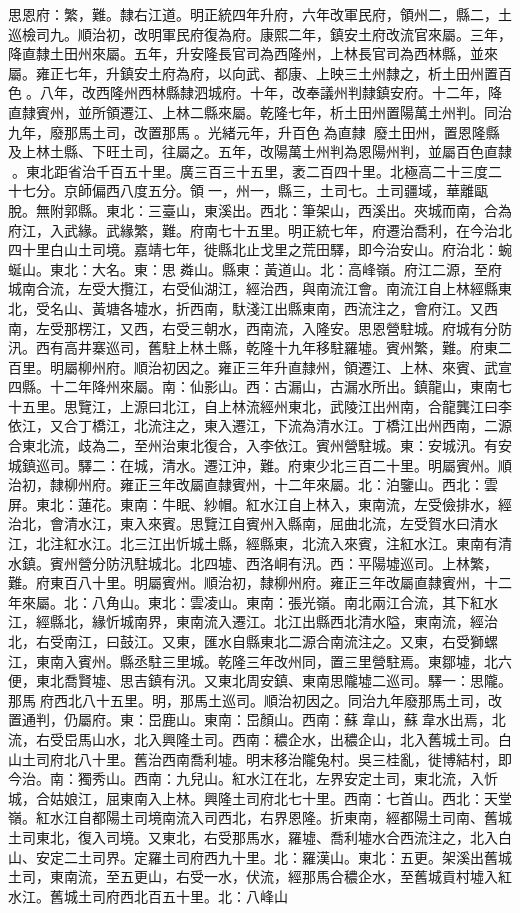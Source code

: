 \begin{pinyinscope}
思恩府：繁，難。隸右江道。明正統四年升府，六年改軍民府，領州二，縣二，土巡檢司九。順治初，改明軍民府復為府。康熙二年，鎮安土府改流官來屬。三年，降直隸土田州來屬。五年，升安隆長官司為西隆州，上林長官司為西林縣，並來屬。雍正七年，升鎮安土府為府，以向武、都康、上映三土州隸之，析土田州置百色。八年，改西隆州西林縣隸泗城府。十年，改奉議州判隸鎮安府。十二年，降直隸賓州，並所領遷江、上林二縣來屬。乾隆七年，析土田州置陽萬土州判。同治九年，廢那馬土司，改置那馬。光緒元年，升百色為直隸，廢土田州，置恩隆縣及上林土縣、下旺土司，往屬之。五年，改陽萬土州判為恩陽州判，並屬百色直隸。東北距省治千百五十里。廣三百三十五里，袤二百四十里。北極高二十三度二十七分。京師偏西八度五分。領一，州一，縣三，土司七。土司疆域，華離甌脫。無附郭縣。東北：三臺山，東溪出。西北：筆架山，西溪出。夾城而南，合為府江，入武緣。武緣繁，難。府南七十五里。明正統七年，府遷治喬利，在今治北四十里白山土司境。嘉靖七年，徙縣北止戈里之荒田驛，即今治安山。府治北：蜿蜒山。東北：大名。東：思粦山。縣東：黃道山。北：高峰嶺。府江二源，至府城南合流，左受大攬江，右受仙湖江，經治西，與南流江會。南流江自上林經縣東北，受名山、黃塘各墟水，折西南，馱淺江出縣東南，西流注之，會府江。又西南，左受那楞江，又西，右受三朝水，西南流，入隆安。思恩營駐城。府城有分防汛。西有高井寨巡司，舊駐上林土縣，乾隆十九年移駐羅墟。賓州繁，難。府東二百里。明屬柳州府。順治初因之。雍正三年升直隸州，領遷江、上林、來賓、武宣四縣。十二年降州來屬。南：仙影山。西：古漏山，古漏水所出。鎮龍山，東南七十五里。思覽江，上源曰北江，自上林流經州東北，武陵江出州南，合龍龔江曰李依江，又合丁橋江，北流注之，東入遷江，下流為清水江。丁橋江出州西南，二源合東北流，歧為二，至州治東北復合，入李依江。賓州營駐城。東：安城汛。有安城鎮巡司。驛二：在城，清水。遷江沖，難。府東少北三百二十里。明屬賓州。順治初，隸柳州府。雍正三年改屬直隸賓州，十二年來屬。北：泊鑒山。西北：雲屏。東北：蓮花。東南：牛眠、紗帽。紅水江自上林入，東南流，左受儉排水，經治北，會清水江，東入來賓。思覽江自賓州入縣南，屈曲北流，左受賀水曰清水江，北注紅水江。北三江出忻城土縣，經縣東，北流入來賓，注紅水江。東南有清水鎮。賓州營分防汛駐城北。北四墟、西洛峒有汛。西：平陽墟巡司。上林繁，難。府東百八十里。明屬賓州。順治初，隸柳州府。雍正三年改屬直隸賓州，十二年來屬。北：八角山。東北：雲凌山。東南：張光嶺。南北兩江合流，其下紅水江，經縣北，緣忻城南界，東南流入遷江。北江出縣西北清水隘，東南流，經治北，右受南江，曰鼓江。又東，匯水自縣東北二源合南流注之。又東，右受獅螺江，東南入賓州。縣丞駐三里城。乾隆三年改州同，置三里營駐焉。東鄒墟，北六便，東北喬賢墟、思吉鎮有汛。又東北周安鎮、東南思隴墟二巡司。驛一：思隴。那馬府西北八十五里。明，那馬土巡司。順治初因之。同治九年廢那馬土司，改置通判，仍屬府。東：岊鹿山。東南：岊顏山。西南：蘇韋山，蘇韋水出焉，北流，右受岊馬山水，北入興隆土司。西南：穠企水，出穠企山，北入舊城土司。白山土司府北八十里。舊治西南喬利墟。明末移治隴兔村。吳三桂亂，徙博結村，即今治。南：獨秀山。西南：九兒山。紅水江在北，左界安定土司，東北流，入忻城，合姑娘江，屈東南入上林。興隆土司府北七十里。西南：七首山。西北：天堂嶺。紅水江自都陽土司境南流入司西北，右界恩隆。折東南，經都陽土司南、舊城土司東北，復入司境。又東北，右受那馬水，羅墟、喬利墟水合西流注之，北入白山、安定二土司界。定羅土司府西九十里。北：羅漢山。東北：五更。架溪出舊城土司，東南流，至五更山，右受一水，伏流，經那馬合穠企水，至舊城貢村墟入紅水江。舊城土司府西北百五十里。北：八峰山
\end{pinyinscope}

